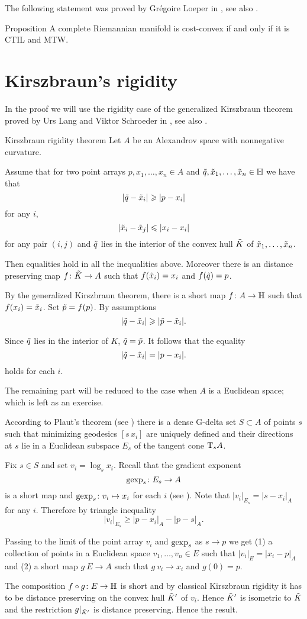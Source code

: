 The following statement was proved by Gr\'egoire Loeper in \cite{loeper}, see also \cite[Proposition 2.5]{MTW+CTIL}.

\begin{thm}{Proposition}\label{prop:cost-convex=CTIL+MTW}
A complete Riemannian manifold is cost-convex if and only if it is CTIL and MTW. 
\end{thm}

\section{Kirszbraun's rigidity}
In the proof we will use the rigidity case of the generalized Kirszbraun theorem proved by Urs Lang and Viktor Schroeder in \cite{LS}, see also \cite{AKP}.

\begin{thm}{Kirszbraun rigidity theorem}\label{thm:kirszbraun-rigid}
Let $A$ be an Alexandrov space with nonnegative curvature.

Assume that for two point arrays $p,x_1,\dots,x_n\in A$ and $\~q, \~x_1,\dots,\~x_n\in \HH$ we have that 
\[|\~q-\~x_i|\ge |p-x_i|\]
for any $i$,
\[|\~x_i-\~x_j|\le |x_i-x_i|\]
for any pair $(i,j)$
and $\~q$ lies in the interior of the convex hull $\~K$ of $\~x_1,\dots,\~x_n$.

Then equalities hold in all the inequalities above.
Moreover there is an distance preserving map $f\:\~K\to A$ such that $f(\~x_i)=x_i$ and $f(\~q)=p$. 
\end{thm}

By the generalized Kirszbraun theorem, there is a short map $f\:A\to \HH$
such that $f(x_i)=\~x_i$.
Set  $\~p=f(p)$.
By assumptions
\[|\~q-\~x_i|\ge |\~p-\~x_i|.\]

Since $\~q$ lies in the interior of $K$, $\~q=\~p$.
It follows that the equality 
\[|\~q-\~x_i|= |p-x_i|.\]
holds for each $i$.

The remaining part will be reduced to the case when $A$ is a Euclidean space;
which is left as an exercise.

According to Plaut's theorem (see \cite{AKP}) there is a dense G-delta set $S\subset A$ of points $s$ such that minimizing geodesics $[s\,x_i]$ are uniquely defined and their directions at $s$ lie in a Euclidean subspace $E_s$ of the tangent cone $\T_sA$.

Fix $s\in S$ and set $v_i=\log_sx_i$.
Recall that the gradient exponent 
\[\gexp_s\:E_s\to A\]
is a short map and $\gexp_s\:v_i\mapsto x_i$ for each $i$ (see \cite{AKP}).
Note that $|v_i|_{E_s}=|s-x_i|_A$ for any $i$.
Therefore by triangle inequality
\[|v_i|_{E_s}\ge |p-x_i|_A-|p-s|_A.\]

Passing to the limit of the point array $v_i$ and $\gexp_s$ as $s\to p$ we get (1) a collection of points in a Euclidean space $v_1,\dots,v_n\in E$ such that $|v_i|_E=|x_i-p|_A$
and (2) a short map $g\:E\to A$ such that $g\:v_i\to x_i$ and $g(0)=p$.

The composition $f\circ g\:E\to \HH$ is short
and by classical Kirszbraun rigidity it has to be distance preserving on the convex hull $\~K'$ of $v_i$.
Hence $\~K'$ is isometric to $\~K$ and the restriction $g|_{\~K'}$ is distance preserving. 
Hence the result.
\qeds
